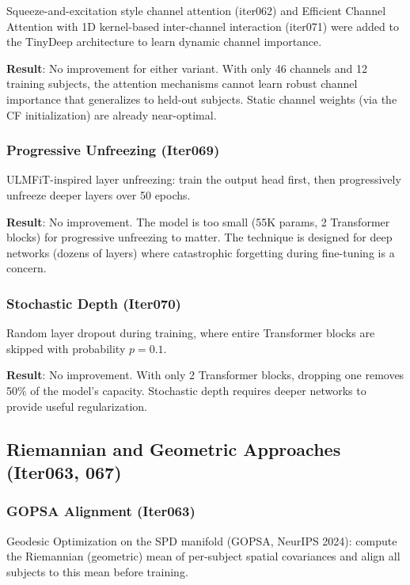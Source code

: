 \documentclass[11pt,a4paper]{article}
\begin{document}
Squeeze-and-excitation style channel attention (iter062) and Efficient
Channel Attention with 1D kernel-based inter-channel interaction (iter071)
were added to the TinyDeep architecture to learn dynamic channel
importance.

\textbf{Result}: No improvement for either variant. With only 46 channels
and 12 training subjects, the attention mechanisms cannot learn robust
channel importance that generalizes to held-out subjects. Static channel
weights (via the CF initialization) are already near-optimal.

\subsubsection{Progressive Unfreezing (Iter069)}

ULMFiT-inspired layer unfreezing: train the output head first, then
progressively unfreeze deeper layers over 50 epochs.

\textbf{Result}: No improvement. The model is too small (55K params, 2
Transformer blocks) for progressive unfreezing to matter. The technique
is designed for deep networks (dozens of layers) where catastrophic
forgetting during fine-tuning is a concern.

\subsubsection{Stochastic Depth (Iter070)}

Random layer dropout during training, where entire Transformer blocks are
skipped with probability $p = 0.1$.

\textbf{Result}: No improvement. With only 2 Transformer blocks, dropping
one removes 50\% of the model's capacity. Stochastic depth requires
deeper networks to provide useful regularization.

\subsection{Riemannian and Geometric Approaches (Iter063, 067)}

\subsubsection{GOPSA Alignment (Iter063)}

Geodesic Optimization on the SPD manifold (GOPSA, NeurIPS 2024): compute
the Riemannian (geometric) mean of per-subject spatial covariances and
align all subjects to this mean before training.
\end{document}
